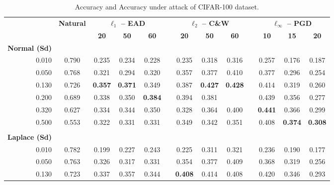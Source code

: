 \begin{table}[htbp]
  \centering
  \tiny
  \caption{Accuracy and Accuracy under attack of CIFAR-100 dataset.}
  \label{table:ap2-cifar100-appendix}%
    \begin{tabular}{rcccccccccccc}
    \toprule
          & \multirow{2}[3]{*}{\textbf{Natural}} & \multicolumn{3}{c}{\textbf{$\ell_1$ -- EAD}} &       & \multicolumn{3}{c}{\textbf{$\ell_2$ -- C\&W}} &       & \multicolumn{3}{c}{\textbf{$\ell_\infty$ -- PGD}} \\
\cmidrule{3-5}\cmidrule{7-9}\cmidrule{11-13}          &       & \textbf{20} & \textbf{50} & \textbf{60} &       & \textbf{20} & \textbf{50} & \textbf{60} &       & \textbf{10} & \textbf{15} & \textbf{20} \\
    \textbf{Normal (Sd)} &       &       &       &       &       &       &       &       &       &       &       &  \\
    0.010 & 0.790 & 0.235 & 0.234 & 0.228 &       & 0.235 & 0.318 & 0.316 &       & 0.257 & 0.176 & 0.187 \\
    0.050 & 0.768 & 0.321 & 0.294 & 0.320 &       & 0.357 & 0.377 & 0.410 &       & 0.377 & 0.296 & 0.254 \\
    0.130 & 0.726 & \textbf{0.357} & \textbf{0.371} & 0.349 &       & 0.387 & \textbf{0.427} & \textbf{0.428} &       & 0.414 & 0.319 & 0.260 \\
    0.200 & 0.689 & 0.338 & 0.350 & \textbf{0.384} &       & 0.394 & 0.381 &       &       & 0.439 & 0.356 & 0.277 \\
    0.320 & 0.627 & 0.334 & 0.344 & 0.350 &       & 0.328 & 0.364 & 0.400 &       & \textbf{0.441} & 0.366 & 0.299 \\
    0.500 & 0.553 & 0.322 & 0.331 & 0.331 &       & 0.349 & 0.342 & 0.351 &       & 0.408 & \textbf{0.374} & \textbf{0.308} \\
          &       &       &       &       &       &       &       &       &       &       &       &  \\
    \textbf{Laplace (Sd)} &       &       &       &       &       &       &       &       &       &       &       &  \\
    \midrule
    0.010 & 0.782 & 0.199 & 0.227 & 0.243 &       & 0.225 & 0.311 & 0.321 &       & 0.236 & 0.190 & 0.177 \\
    0.050 & 0.763 & 0.326 & 0.317 & 0.331 &       & 0.354 & 0.377 & 0.409 &       & 0.368 & 0.319 & 0.256 \\
    0.130 & 0.723 & 0.337 & 0.357 & 0.344 &       & \textbf{0.408} & 0.414 & 0.408 &       & 0.420 & 0.346 & 0.293 \\

\end{tabular}
\end{table}
